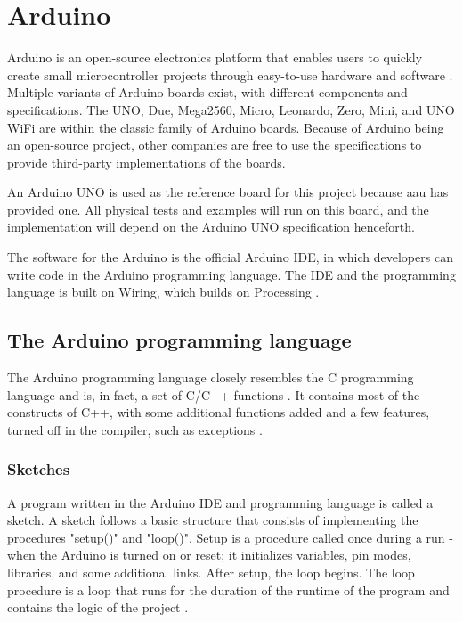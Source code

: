 \section{Arduino}\label{sec:arduino}
Arduino is an open-source electronics platform that enables users to quickly create small microcontroller projects through easy-to-use hardware and software \cite{WhatArduino}. Multiple variants of Arduino boards exist, with different components and specifications. The UNO, Due, Mega2560, Micro, Leonardo, Zero, Mini, and UNO WiFi are within the classic family of Arduino boards. Because of Arduino being an open-source project, other companies are free to use the specifications to provide third-party implementations of the boards.

An Arduino UNO is used as the reference board for this project because \gls{aau} has provided one. All physical tests and examples will run on this board, and the implementation will depend on the Arduino UNO specification henceforth.

The software for the Arduino is the official Arduino IDE, in which developers can write code in the Arduino programming language. The IDE and the programming language is built on Wiring, which builds on Processing \cite{WhatArduino,WiringOrg}.

\subsection{The Arduino programming language}\label{subsec:arduinoprogramminglanguage}
The Arduino programming language closely resembles the C programming language and is, in fact, a set of C/C++ functions \cite{ArduinoSupportC}. It contains most of the constructs of C++, with some additional functions added and a few features, turned off in the compiler, such as exceptions \cite{Nongnuorg}.

\subsubsection{Sketches}
A program written in the Arduino IDE and programming language is called a sketch. A sketch follows a basic structure that consists of implementing the procedures "setup()" and "loop()". Setup is a procedure called once during a run - when the Arduino is turned on or reset; it initializes variables, pin modes, libraries, and some additional links. After setup, the loop begins. The loop procedure is a loop that runs for the duration of the runtime of the program and contains the logic of the project \cite{ArduinoLanguage}.

